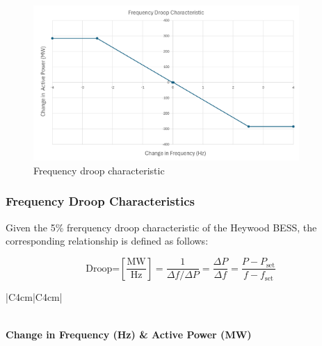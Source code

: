 \documentclass{../grid-link-report}
\begin{document}
	
	\begin{figure}[H]
		\centering
		\includegraphics[width=0.9\textwidth]{report-assets/images/fdroop-char.png}
		\caption{Frequency droop characteristic}
		\label{fig:fdroop-char}
	\end{figure}
	
	\subsubsection{Frequency Droop Characteristics}
	
	
	Given the 5\% frerquency droop characteristic of the Heywood BESS, the corresponding relationship is defined as follows:
	

\[
\text{Droop=} \left[ \frac{\text{MW}}{\text{Hz}} \right] = \frac{1}{\Delta f / \Delta P} = \frac{\Delta P}{\Delta f} = \frac{P - P_{\text{set}}}{f - f_{\text{set}}}
\]



	
		{	
		\thicktablelines
		\begin{longtable}{|C{4cm}|C{4cm}|}%
			\caption{Frequency droop characteristic tabulated}%
			\label{tab:frq-droop-char-new} \\%
			\toprule
			\bfseries \color{white}Change in Frequency (Hz) & \bfseries \color{white}Active Power (MW) \\%
			\endhead
			\bottomrule \endfoot
			\\\hline
		\end{longtable}
	}	
	
\end{document}
